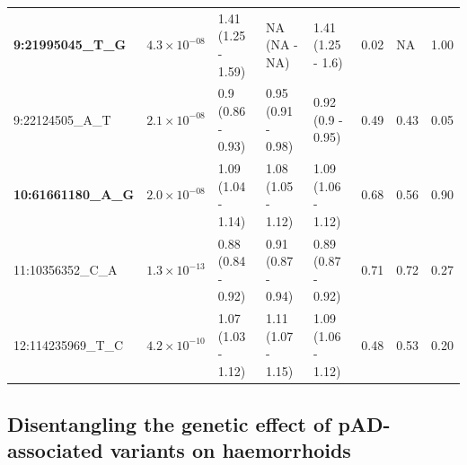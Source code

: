 \begin{table}[H]
\begin{adjustwidth}{-.5in}{-.5in}
\begin{tabular}[t]{p{}llllp{}p{}p{}}
      \textbf{9:21995045\_T\_G} & $4.3\times10^{-08}$ & 1.41 (1.25 - 1.59) & NA (NA - NA) & 1.41 (1.25 - 1.6) & 0.02 & NA & 1.00\\
      9:22124505\_A\_T & $2.1\times10^{-08}$ & 0.9 (0.86 - 0.93) & 0.95 (0.91 - 0.98) & 0.92 (0.9 - 0.95) & 0.49 & 0.43 & 0.05\\
      \textbf{10:61661180\_A\_G} & $2.0\times10^{-08}$ & 1.09 (1.04 - 1.14) & 1.08 (1.05 - 1.12) & 1.09 (1.06 - 1.12) & 0.68 & 0.56 & 0.90\\
      11:10356352\_C\_A & $1.3\times10^{-13}$ & 0.88 (0.84 - 0.92) & 0.91 (0.87 - 0.94) & 0.89 (0.87 - 0.92) & 0.71 & 0.72 & 0.27\\
      12:114235969\_T\_C & $4.2\times10^{-10}$ & 1.07 (1.03 - 1.12) & 1.11 (1.07 - 1.15) & 1.09 (1.06 - 1.12) & 0.48 & 0.53 & 0.20\\
      \bottomrule
      \end{tabular}
    \end{adjustwidth}

      \end{table}   

      
      
    
 

  \subsection{Disentangling the genetic effect of pAD-associated variants on haemorrhoids}

